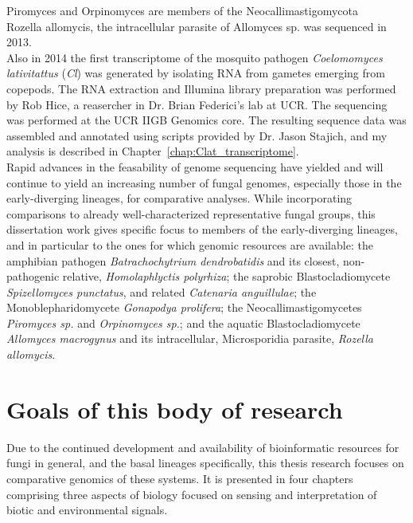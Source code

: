 \indent Piromyces and Orpinomyces are members of the Neocallimastigomycota \\
\indent Rozella allomycis, the intracellular parasite of Allomyces sp. was sequenced in 2013.\\
\indent Also in 2014 the first transcriptome of the mosquito pathogen \textit{Coelomomyces lativitattus} (\textit{Cl}) was generated by isolating RNA from gametes emerging from copepods. The RNA extraction and Illumina library preparation was performed by Rob Hice, a reasercher in Dr. Brian Federici's lab at UCR. The sequencing was performed at the UCR IIGB Genomics core. The resulting sequence data was assembled and annotated using scripts provided by Dr. Jason Stajich, and my analysis is described in Chapter~\ref{chap:Clat_transcriptome}.\\
\indent Rapid advances in the feasability of genome sequencing have yielded and will continue to yield an increasing number of fungal genomes, especially those in the early-diverging lineages, for comparative analyses. While incorporating comparisons to already well-characterized representative fungal groups, this dissertation work gives specific focus to members of the early-diverging lineages, and in particular to the ones for which genomic resources are available: the amphibian pathogen \textit{Batrachochytrium dendrobatidis} and its closest, non-pathogenic relative, \textit{Homolaphlyctis polyrhiza}; the saprobic Blastocladiomycete \textit{Spizellomyces punctatus}, and related \textit{Catenaria anguillulae}; the Monoblepharidomycete \textit{Gonapodya prolifera}; the Neocallimastigomycetes \textit{Piromyces sp.} and \textit{Orpinomyces sp.}; and the aquatic Blastocladiomycete \textit{Allomyces macrogynus} and its intracellular, Microsporidia parasite, \textit{Rozella allomycis}.

\section{Goals of this body of research}
Due to the continued development and availability of bioinformatic resources for fungi in general, and the basal lineages specifically, this thesis research focuses on comparative genomics of these systems. It is presented in four chapters comprising three aspects of biology focused on sensing and interpretation of biotic and environmental signals.\\

